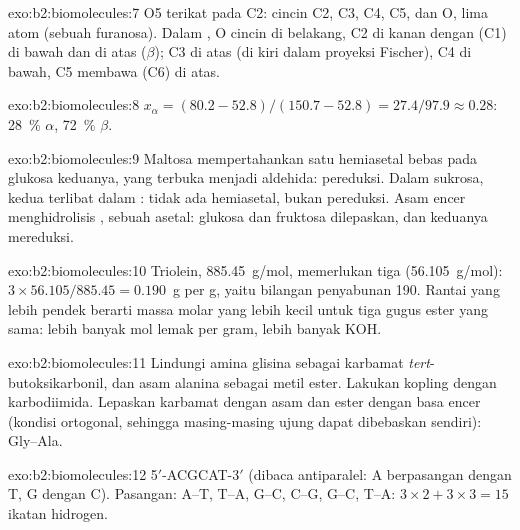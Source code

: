 \begin{solution}{exo:b2:biomolecules:7}
O5 terikat pada C2: cincin C2, C3, C4, C5, dan O, lima atom (sebuah
furanosa). Dalam , O cincin di belakang, C2 di kanan dengan
 (C1) di bawah dan  di atas ($\beta$);  C3 di atas
(di kiri dalam proyeksi Fischer),  C4 di bawah, C5 membawa 
(C6) di atas.
\end{solution}

\begin{solution}{exo:b2:biomolecules:8}
$x_\alpha = (80.2 - 52.8)/(150.7 - 52.8) = 27.4/97.9 \approx 0.28$: 28~\% $\alpha$, 72~\% $\beta$.
\end{solution}

\begin{solution}{exo:b2:biomolecules:9}
Maltosa mempertahankan satu hemiasetal bebas pada glukosa keduanya, yang
terbuka menjadi aldehida: pereduksi. Dalam sukrosa, kedua 
terlibat dalam : tidak ada hemiasetal, bukan pereduksi.
Asam encer menghidrolisis , sebuah asetal: glukosa dan
fruktosa dilepaskan, dan keduanya mereduksi.
\end{solution}

\begin{solution}{exo:b2:biomolecules:10}
Triolein, \qty{885.45}{g/mol}, memerlukan tiga  (\qty{56.105}{g/mol}): $3 \times 56.105/885.45 =
0.190$~g per g, yaitu bilangan penyabunan 190. Rantai yang lebih pendek
berarti massa molar yang lebih kecil untuk tiga gugus ester yang sama: lebih
banyak mol lemak per gram, lebih banyak KOH.
\end{solution}

\begin{solution}{exo:b2:biomolecules:11}
Lindungi amina glisina sebagai karbamat \textit{tert}-butoksikarbonil, dan
asam alanina sebagai metil ester. Lakukan kopling dengan karbodiimida.
Lepaskan karbamat dengan asam dan ester dengan basa encer (kondisi
ortogonal, sehingga masing-masing ujung dapat dibebaskan sendiri):
Gly--Ala.
\end{solution}

\begin{solution}{exo:b2:biomolecules:12}
5$'$-ACGCAT-3$'$ (dibaca antiparalel: A berpasangan dengan T, G dengan C).
Pasangan: A--T, T--A, G--C, C--G, G--C, T--A:
$3 \times 2 + 3 \times 3 = 15$ ikatan hidrogen.
\end{solution}


